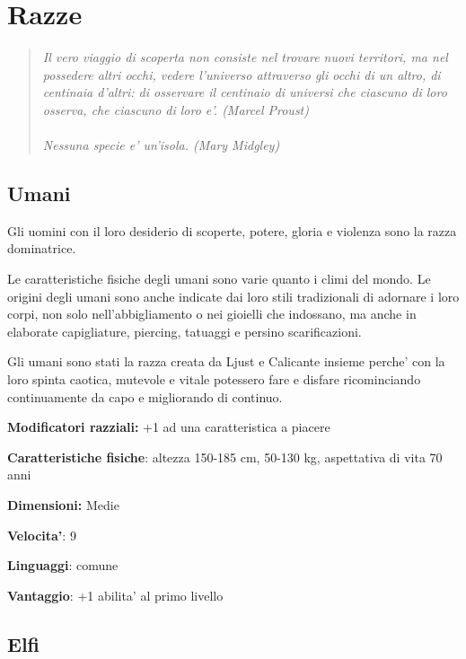 \documentclass[a4paper,11pt,twoside,openany]{book}
\begin{document}
	\pagebreak
	
	
	\section{Razze}
	
	\begin{quote}\textit{
			Il vero viaggio di scoperta non consiste nel trovare nuovi territori, ma nel possedere altri occhi, vedere l'universo attraverso gli occhi di un altro, di centinaia d'altri: di osservare il centinaio di universi che ciascuno di loro osserva, che ciascuno di loro e'. (Marcel Proust)\\
			\\
			Nessuna specie e' un'isola. (Mary Midgley)
	}\end{quote}
	
	\subsection{Umani}
	
	Gli uomini con il loro desiderio di scoperte, potere, gloria e violenza sono la razza dominatrice.
	
	Le caratteristiche fisiche degli umani sono varie quanto i climi del mondo. Le origini degli umani sono anche indicate dai loro stili tradizionali di adornare i loro corpi, non solo nell'abbigliamento o nei gioielli che indossano, ma anche in elaborate capigliature, piercing, tatuaggi e persino scarificazioni.
	
	Gli umani sono stati la razza creata da Ljust e Calicante insieme perche' con la loro spinta caotica, mutevole e vitale potessero fare e disfare ricominciando continuamente da capo e migliorando di continuo.
	
	\textbf{Modificatori razziali:} +1 ad una caratteristica a piacere
	
	\textbf{Caratteristiche fisiche}: altezza 150-185 cm, 50-130 kg, aspettativa di vita 70 anni
	
	\textbf{Dimensioni:} Medie
	
	\textbf{Velocita'}: 9
	
	\textbf{Linguaggi}: comune
	
	\textbf{Vantaggio}: +1 abilita' al primo livello
	
	\subsection{Elfi}
	
\end{document}

